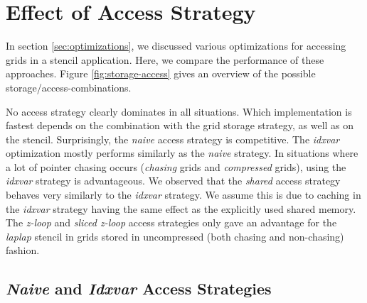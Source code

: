 \section{Effect of Access Strategy} \label{sec:res-access}

In section \ref{sec:optimizations}, we discussed various optimizations for accessing grids in a stencil application. Here, we compare the performance of these approaches. Figure \ref{fig:storage-access} gives an overview of the possible storage/access-combinations.

No access strategy clearly dominates in all situations. Which implementation is fastest depends on the combination with the grid storage strategy, as well as on the stencil. Surprisingly, the \emph{naive} access strategy is competitive. The \emph{idxvar} optimization mostly performs similarly as the \emph{naive} strategy. In situations where a lot of pointer chasing occurs (\emph{chasing} grids and \emph{compressed} grids), using the \emph{idxvar} strategy is advantageous. We observed that the \emph{shared} access strategy behaves very similarly to the \emph{idxvar} strategy. We assume this is due to caching in the \emph{idxvar} strategy having the same effect as the explicitly used shared memory. The \emph{z-loop} and \emph{sliced z-loop} access strategies only gave an advantage for the \emph{laplap} stencil in grids stored in uncompressed (both chasing and non-chasing) fashion.


\subsection{\emph{Naive} and \emph{Idxvar} Access Strategies}

